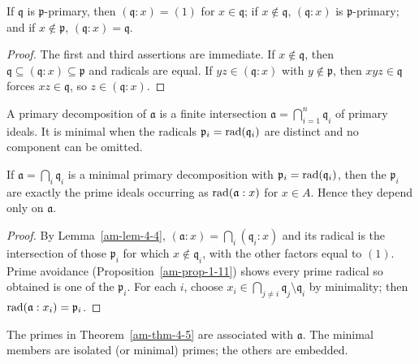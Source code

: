 \begin{lemma}
\label{am-lem-4-4}
\uses{}
If $\mathfrak{q}$ is $\mathfrak{p}$-primary, then $(\mathfrak{q}:x)=(1)$ for $x\in\mathfrak{q}$; if $x\notin\mathfrak{q}$,
$(\mathfrak{q}:x)$ is $\mathfrak{p}$-primary; and if $x\notin\mathfrak{p}$, $(\mathfrak{q}:x)=\mathfrak{q}$.
\end{lemma}
\begin{proof}
The first and third assertions are immediate.  If $x\notin\mathfrak{q}$, then
$\mathfrak{q}\subseteq(\mathfrak{q}:x)\subseteq\mathfrak{p}$ and radicals are equal.  If $yz\in(\mathfrak{q}:x)$
with $y\notin\mathfrak{p}$, then $xyz\in\mathfrak{q}$ forces $xz\in\mathfrak{q}$, so
$z\in(\mathfrak{q}:x)$.
\end{proof}
\begin{definition}
\label{am-def-primary-decomp}
\uses{}
A primary decomposition of $\mathfrak{a}$ is a finite intersection
$\mathfrak{a}=\bigcap_{i=1}^n\mathfrak{q}_i$ of primary ideals.  It is minimal when the
radicals $\mathfrak{p}_i=\operatorname{rad}(\mathfrak{q}_i)$ are distinct and no component can be omitted.
\end{definition}
\begin{theorem}
\label{am-thm-4-5}
\uses{}
If $\mathfrak{a}=\bigcap_i\mathfrak{q}_i$ is a minimal primary decomposition with
$\mathfrak{p}_i=\operatorname{rad}(\mathfrak{q}_i)$, then the $\mathfrak{p}_i$ are exactly the prime ideals occurring as
$\operatorname{rad}(\mathfrak{a}:x)$ for $x\in A$.  Hence they depend only on $\mathfrak{a}$.
\end{theorem}
\begin{proof}
By Lemma~\ref{am-lem-4-4},
$(\mathfrak{a}:x)=\bigcap_i(\mathfrak{q}_i:x)$ and its radical is the intersection of those
$\mathfrak{p}_i$ for which $x\notin\mathfrak{q}_i$, with the other factors equal to $(1)$.
Prime avoidance (Proposition~\ref{am-prop-1-11}) shows every prime radical so
obtained is one of the $\mathfrak{p}_i$.  For each $i$, choose
$x_i\in\bigcap_{j\ne i}\mathfrak{q}_j\setminus\mathfrak{q}_i$ by minimality; then
$\operatorname{rad}(\mathfrak{a}:x_i)=\mathfrak{p}_i$.
\end{proof}
\begin{definition}
\label{am-def-associated-primes}
\uses{}
The primes in Theorem~\ref{am-thm-4-5} are associated with $\mathfrak{a}$.  The
minimal members are isolated (or minimal) primes; the others are embedded.
\end{definition}
